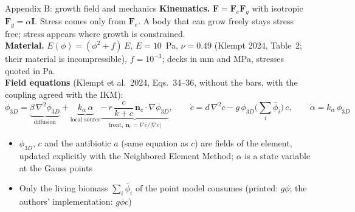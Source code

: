 \documentclass[aspectratio=169,11pt]{beamer}
\begin{document}
\begin{frame}[label=appB]{Appendix B: growth field and mechanics}
\small
\textbf{Kinematics.} $\mathbf F=\mathbf F_e\mathbf F_g$ with isotropic
$\mathbf F_g=\alpha\mathbf I$. Stress comes only from $\mathbf F_e$. A body
that can grow freely stays stress free; stress appears where growth is
constrained.\\[3pt]
\textbf{Material.} $E(\phi)=(\phi^2+f)\,E$, $E=10$~Pa, $\nu=0.49$
(Klempt 2024, Table~2; their material is incompressible), $f=10^{-3}$;
decks in mm and MPa, stresses quoted in Pa.\\[3pt]
\textbf{Field equations} (Klempt et al.\ 2024, Eqs.~34--36, without the bars, with the coupling agreed with the IKM):
\[
\dot\phi_{3D}=\underbrace{\beta\,\nabla^2\phi_{3D}}_{\text{diffusion}}
+\underbrace{k_\alpha\,\alpha}_{\text{local source}}
\underbrace{-\,r\,\frac{c}{k+c}\,\mathbf n_c\cdot\nabla\phi_{3D}}_{\text{front},\ \mathbf n_c=\nabla c/|\nabla c|},
\qquad
\dot c=d\,\nabla^2c-g\,\phi_{3D}\Big(\sum_i\bar\phi_i\Big)\,c,
\qquad
\dot\alpha=k_\alpha\,\phi_{3D}
\]
\begin{itemize}
  \item $\phi_{3D}$, $c$ and the antibiotic $a$ (same equation as $c$) are fields of the element, updated explicitly
        with the Neighbored Element Method; $\alpha$ is a state variable at the Gauss points
  \item Only the living biomass $\sum_i\bar\phi_i$ of the point model consumes (printed: $g\phi$; the authors'
        implementation: $g\phi c$)
\end{itemize}
\end{frame}
\end{document}
